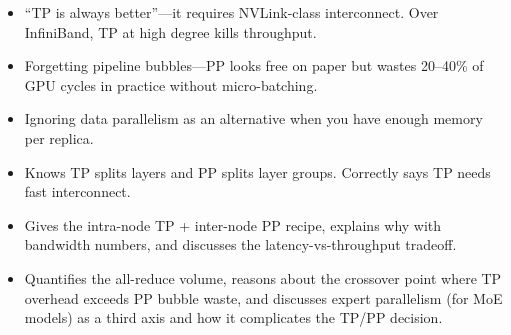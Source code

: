 \begin{interviewq}
\redflags
\begin{itemize}
    \item ``TP is always better''---it requires NVLink-class interconnect. Over InfiniBand, TP at high degree kills throughput.
    \item Forgetting pipeline bubbles---PP looks free on paper but wastes 20--40\% of GPU cycles in practice without micro-batching.
    \item Ignoring data parallelism as an alternative when you have enough memory per replica.
\end{itemize}


\goodgreat
\begin{itemize}
    \item {} Knows TP splits layers and PP splits layer groups. Correctly says TP needs fast interconnect.
    \item {} Gives the intra-node TP + inter-node PP recipe, explains why with bandwidth numbers, and discusses the latency-vs-throughput tradeoff.
    \item {} Quantifies the all-reduce volume, reasons about the crossover point where TP overhead exceeds PP bubble waste, and discusses expert parallelism (for MoE models) as a third axis and how it complicates the TP/PP decision.
\end{itemize}

\end{interviewq}


